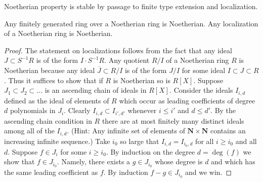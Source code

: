 \begin{lemma}
\label{lemma-Noetherian-permanence}
\begin{slogan}
Noetherian property is stable by passage to finite type extension
and localization.
\end{slogan}
Any finitely generated ring over a Noetherian ring
is Noetherian. Any localization of a Noetherian ring
is Noetherian.
\end{lemma}

\begin{proof}
The statement on localizations follows from the fact
that any ideal $J \subset S^{-1}R$ is of the form
$I \cdot S^{-1}R$. Any quotient $R/I$ of a Noetherian
ring $R$ is Noetherian because any ideal $\overline{J} \subset R/I$
is of the form $J/I$ for some ideal $I \subset J \subset R$.
Thus it suffices to show that if $R$ is Noetherian so
is $R[X]$. Suppose $J_1 \subset J_2 \subset \ldots$ is an
ascending chain of ideals in $R[X]$. Consider the ideals $I_{i, d}$
defined as the ideal of elements of $R$ which occur as leading
coefficients of degree $d$ polynomials in $J_i$.
Clearly $I_{i, d} \subset I_{i', d'}$ whenever
$i \leq i'$ and $d \leq d'$. By the ascending chain condition
in $R$ there are at most finitely many distinct ideals among all of
the $I_{i, d}$.
(Hint: Any infinite set of elements of
$\mathbf{N} \times \mathbf{N}$ contains an increasing
infinite sequence.)
Take $i_0$ so large that $I_{i, d} = I_{i_0, d}$
for all $i \geq i_0$ and all $d$. Suppose $f \in J_i$ for some $i \geq i_0$.
By induction on the degree $d = \deg(f)$ we show that $f \in J_{i_0}$.
Namely, there exists a $g\in J_{i_0}$ whose degree is $d$ and which
has the same leading coefficient as $f$. By induction
$f - g \in J_{i_0}$ and we win.
\end{proof}